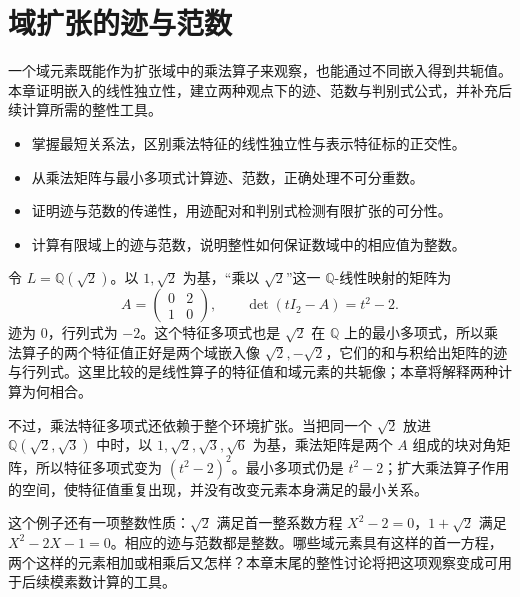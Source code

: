 
\chapter{域扩张的迹与范数}
\label{b1:ch:18}

\begin{chapterabstract}
	一个域元素既能作为扩张域中的乘法算子来观察，也能通过不同嵌入得到共轭值。本章证明嵌入的线性独立性，建立两种观点下的迹、范数与判别式公式，并补充后续计算所需的整性工具。
\end{chapterabstract}

\begin{learninggoals}
	\begin{itemize}
		\item 掌握最短关系法，区别乘法特征的线性独立性与表示特征标的正交性。
		\item 从乘法矩阵与最小多项式计算迹、范数，正确处理不可分重数。
		\item 证明迹与范数的传递性，用迹配对和判别式检测有限扩张的可分性。
		\item 计算有限域上的迹与范数，说明整性如何保证数域中的相应值为整数。
	\end{itemize}
\end{learninggoals}

令 \(L=\mathbb Q(\sqrt2)\)。以 \(1,\sqrt2\) 为基，“乘以 \(\sqrt2\)”这一 \(\mathbb Q\)-线性映射的矩阵为
\[
	A=\begin{pmatrix}0&2\\1&0\end{pmatrix},\qquad
	\det(tI_2-A)=t^2-2.
\]
迹为 \(0\)，行列式为 \(-2\)。这个特征多项式也是 \(\sqrt2\) 在 \(\mathbb Q\) 上的最小多项式，所以乘法算子的两个特征值正好是两个域嵌入像 \(\sqrt2,-\sqrt2\)，它们的和与积给出矩阵的迹与行列式。这里比较的是线性算子的特征值和域元素的共轭像；本章将解释两种计算为何相合。

\ProseParagraphBreak
不过，乘法特征多项式还依赖于整个环境扩张。当把同一个 \(\sqrt2\) 放进 \(\mathbb Q(\sqrt2,\sqrt3)\) 中时，以 \(1,\sqrt2,\sqrt3,\sqrt6\) 为基，乘法矩阵是两个 \(A\) 组成的块对角矩阵，所以特征多项式变为 \((t^2-2)^2\)。最小多项式仍是 \(t^2-2\)；扩大乘法算子作用的空间，使特征值重复出现，并没有改变元素本身满足的最小关系。

\ProseParagraphBreak
这个例子还有一项整数性质：\(\sqrt2\) 满足首一整系数方程 \(X^2-2=0\)，\(1+\sqrt2\) 满足 \(X^2-2X-1=0\)。相应的迹与范数都是整数。哪些域元素具有这样的首一方程，两个这样的元素相加或相乘后又怎样？本章末尾的整性讨论将把这项观察变成可用于后续模素数计算的工具。

